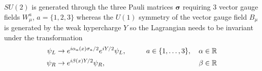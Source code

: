 $SU(2)$ is generated through the three Pauli matrices $\bm{\sigma}$ requiring 3 vector gauge fields $W^a_\mu$, $a=\{1,2,3\}$ whereas the $U(1)$ symmetry of the vector gauge field $B_\mu$ is generated by the weak hypercharge $Y$ so the Lagrangian needs to be invariant under the transformation
\begin{align}
    \psi_{L} & \rightarrow e^{i \alpha_a(x) \sigma_a/2}e^{ iY/2} \psi_{L},\qquad & a\in\{1,\mathellipsis,3\} ,\quad \alpha\in\mathbb{R} & \label{eq:gauge_transformation_left}
    \\
    \psi_{R} & \rightarrow e^{ i\beta(x) Y/2} \psi_{R},\qquad                    & \beta\in\mathbb{R}                                   & \label{eq:gauge_transformation_right}
\end{align}


